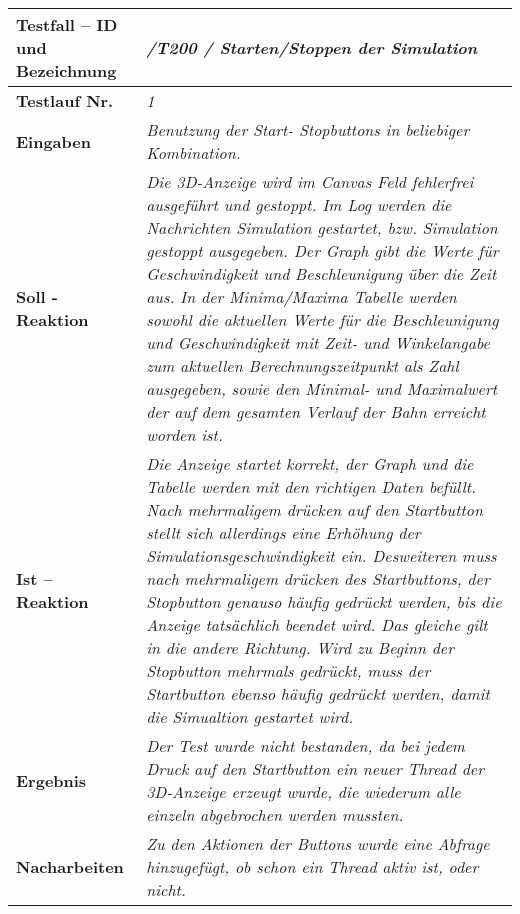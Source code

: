 \begin{longtable}{|p{7cm}|p{10cm}|}
\hline
\textbf{Testfall -- ID und Bezeichnung} & \textit{ /T200 / Starten/Stoppen der Simulation} \\
\hline
\textbf{Testlauf Nr.} & \textit{1} \\
\hline
\textbf{Eingaben} & \textit{Benutzung der Start- Stopbuttons in beliebiger Kombination.} \\
\hline
\textbf{Soll - Reaktion} & \textit{Die 3D-Anzeige wird im Canvas Feld fehlerfrei ausgeführt und gestoppt. Im Log werden die Nachrichten Simulation gestartet, bzw. Simulation gestoppt ausgegeben.
Der Graph gibt die Werte für Geschwindigkeit und Beschleunigung über die Zeit aus. In der Minima/Maxima Tabelle werden sowohl die aktuellen Werte für die Beschleunigung und Geschwindigkeit mit 
Zeit- und Winkelangabe zum aktuellen Berechnungszeitpunkt als Zahl ausgegeben, sowie den Minimal- und Maximalwert der auf dem gesamten Verlauf der Bahn erreicht worden ist.
} \\
\hline
\textbf{Ist -- Reaktion} & \textit{Die Anzeige startet korrekt, der Graph und die Tabelle werden mit den richtigen Daten befüllt. Nach mehrmaligem drücken auf den Startbutton stellt sich allerdings 
eine Erhöhung der Simulationsgeschwindigkeit ein. Desweiteren muss nach mehrmaligem drücken des Startbuttons, der Stopbutton genauso häufig gedrückt werden, bis die Anzeige tatsächlich beendet wird.
Das gleiche gilt in die andere Richtung. Wird zu Beginn der Stopbutton mehrmals gedrückt, muss der Startbutton ebenso häufig gedrückt werden, damit die Simualtion gestartet wird.} \\
\hline
\textbf{Ergebnis} & \textit{Der Test wurde nicht bestanden, da bei jedem Druck auf den Startbutton ein neuer Thread der 3D-Anzeige erzeugt wurde, die wiederum alle einzeln abgebrochen werden mussten.} \\
\hline
\textbf{Nacharbeiten } & \textit{Zu den Aktionen der Buttons wurde eine Abfrage hinzugefügt, ob schon ein Thread aktiv ist, oder nicht.} \\
\hline
 \end{longtable}



